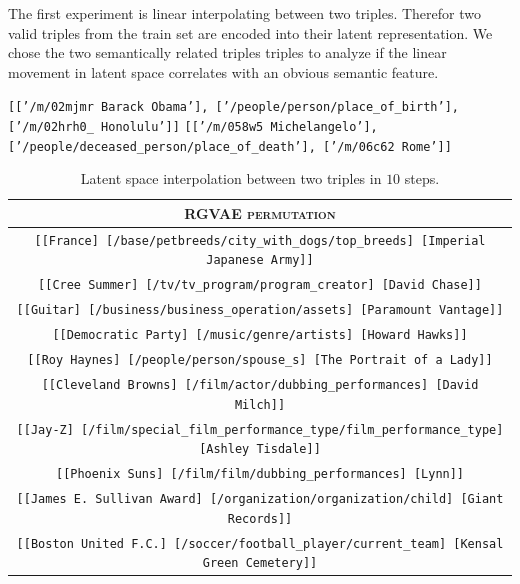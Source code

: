 The first experiment is linear interpolating between two triples. Therefor two valid triples from the train set are encoded into their latent representation. We chose the two semantically related triples triples to analyze if the linear movement in latent space correlates with an obvious semantic feature. 

\begin{center}
  \texttt{[['/m/02mjmr Barack Obama'], ['/people/person/place\_of\_birth'], ['/m/02hrh0\_	Honolulu']]}
  \texttt{[['/m/058w5 Michelangelo'], ['/people/deceased\_person/place\_of\_death'], ['/m/06c62	Rome']]}
\end{center}



\begin{table}[H]
  \centering
  \begin{tabular}{|c|}
  \hline
  \rowcolor[HTML]{EFEFEF} 
  \textsc{RGVAE permutation}\\ \hline
  \texttt{[[France] [/base/petbreeds/city\_with\_dogs/top\_breeds] [Imperial Japanese Army]]}\\
  \texttt{[[Cree Summer] [/tv/tv\_program/program\_creator] [David Chase]]}\\
  \texttt{[[Guitar] [/business/business\_operation/assets] [Paramount Vantage]]}\\
  \texttt{[[Democratic Party] [/music/genre/artists] [Howard Hawks]]}\\
  \texttt{[[Roy Haynes] [/people/person/spouse\_s] [The Portrait of a Lady]]}\\
  \texttt{[[Cleveland Browns] [/film/actor/dubbing\_performances] [David Milch]]}\\
  \texttt{[[Jay-Z] [/film/special\_film\_performance\_type/film\_performance\_type] [Ashley Tisdale]]}\\
  \texttt{[[Phoenix Suns] [/film/film/dubbing\_performances] [Lynn]]}\\
  \texttt{[[James E. Sullivan Award] [/organization/organization/child] [Giant Records]]}\\
  \texttt{[[Boston United F.C.] [/soccer/football\_player/current\_team] [Kensal Green Cemetery]]}\\  
  \hline
  \end{tabular}
\caption{Latent space interpolation between two triples in $10$ steps.}
\label{tab5:ipbtw2}
\end{table}

